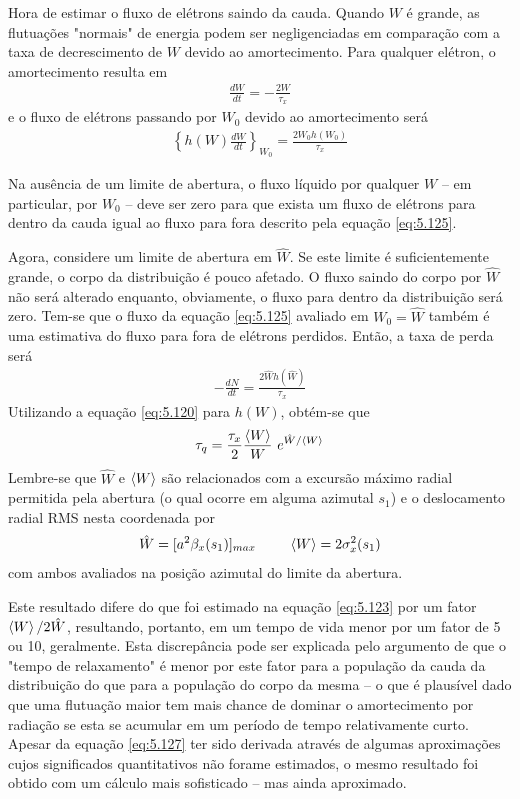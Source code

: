 Hora de estimar o fluxo de elétrons saindo da cauda. Quando $W$ é grande, as flutuações "normais" de energia podem ser negligenciadas em comparação com a taxa de decrescimento de $W$ devido ao amortecimento. Para qualquer elétron, o amortecimento resulta em
\begin{align}
	\frac{dW}{dt} = -\frac{2W}{\tau_x}
\end{align}
e o fluxo de elétrons passando por $W_0$ devido ao amortecimento será
\begin{align}
	\left\{h(W) \frac{dW}{dt}\right\}_{W_0} = \frac{2W_0 h(W_0)}{\tau_x}\label{eq:5.125}
\end{align}

Na ausência de um limite de abertura, o fluxo líquido por qualquer $W$ -- em particular, por $W_0$ -- deve ser zero para que exista um fluxo de elétrons para dentro da cauda igual ao fluxo para fora descrito pela equação \eqref{eq:5.125}.

Agora, considere um limite de abertura em $\hat{W}$. Se este limite é suficientemente grande, o corpo da distribuição é pouco afetado. O fluxo saindo do corpo por $\hat{W}$ não será alterado enquanto, obviamente, o fluxo para dentro da distribuição será zero. Tem-se que o fluxo da equação \eqref{eq:5.125} avaliado em $W_0= \hat{W}$ também é uma estimativa do fluxo para fora de elétrons perdidos. Então, a taxa de perda será
\begin{align}
	-\frac{dN}{dt} = \frac{2\hat{W} h(\hat{W})}{\tau_x}
\end{align}
Utilizando a equação \eqref{eq:5.120} para $h(W)$, obtém-se que
\begin{align}
	\tau_q = \frac{\tau_x}{2} \frac{\mean{W}}{W}\ e^{\hat{W}/\mean{W}}\label{eq:5.127}
\end{align}
Lembre-se que $\hat{W}$ e $\left< W \right>$ são relacionados com a excursão máximo radial permitida pela abertura (o qual ocorre em alguma azimutal $s_1$) e o deslocamento radial RMS nesta coordenada por
\begin{align}
	\hat{W} = [a^2 \beta_x(s_1)]_{max}\ \ \ \ \ \ \ \left< W \right> = 2\sigma_x^2(s_1)
\end{align}
com ambos avaliados na posição azimutal do limite da abertura.

Este resultado difere do que foi estimado na equação \eqref{eq:5.123} por um fator $\left< W \right>/2\hat{W}$, resultando, portanto, em um tempo de vida menor por um fator de 5 ou 10, geralmente. Esta discrepância pode ser explicada pelo argumento de que o "tempo de relaxamento" é menor por este fator para a população da cauda da distribuição do que para a população do corpo da mesma -- o que é plausível dado que uma flutuação maior tem mais chance de dominar o amortecimento por radiação se esta se acumular em um período de tempo relativamente curto. Apesar da equação \eqref{eq:5.127} ter sido derivada através de algumas aproximações cujos significados quantitativos não forame estimados, o mesmo resultado foi obtido com um cálculo mais sofisticado -- mas ainda aproximado.

